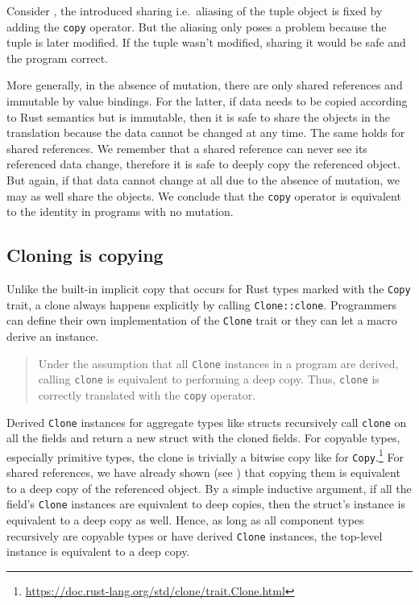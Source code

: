 Consider , the introduced sharing
i.e.~aliasing of the tuple object is fixed by adding the
\passthrough{\lstinline!copy!} operator. But the aliasing only poses a
problem because the tuple is later modified. If the tuple wasn't
modified, sharing it would be safe and the program correct.

More generally, in the absence of mutation, there are only shared
references and immutable by value bindings. For the latter, if data
needs to be copied according to Rust semantics but is immutable, then it
is safe to share the objects in the translation because the data cannot
be changed at any time. The same holds for shared references. We
remember that a shared reference can never see its referenced data
change, therefore it is safe to deeply copy the referenced object. But
again, if that data cannot change at all due to the absence of mutation,
we may as well share the objects. We conclude that the
\passthrough{\lstinline!copy!} operator is equivalent to the identity in
programs with no mutation.

\subsection{Cloning is copying}
\label{sec:clone-is-copy}

Unlike the built-in implicit copy that occurs for Rust types marked with
the \passthrough{\lstinline!Copy!} trait, a clone always happens
explicitly by calling \passthrough{\lstinline!Clone::clone!}.
Programmers can define their own implementation of the
\passthrough{\lstinline!Clone!} trait or they can let a macro derive an
instance.

\begin{quote}
Under the assumption that all \passthrough{\lstinline!Clone!} instances
in a program are derived, calling \passthrough{\lstinline!clone!} is
equivalent to performing a deep copy. Thus,
\passthrough{\lstinline!clone!} is correctly translated with the
\passthrough{\lstinline!copy!} operator.
\end{quote}

Derived \passthrough{\lstinline!Clone!} instances for aggregate types like
structs recursively call \passthrough{\lstinline!clone!} on all the fields and
return a new struct with the cloned fields. For copyable types, especially
primitive types, the clone is trivially a bitwise copy like for
\lstinline!Copy!.\footnote{\url{https://doc.rust-lang.org/std/clone/trait.Clone.html}}
For shared references, we have already shown (see
) that copying them is equivalent to a deep
copy of the referenced object. By a simple inductive argument, if all the
field's \passthrough{\lstinline!Clone!} instances are equivalent to deep copies,
then the struct's instance is equivalent to a deep copy as well. Hence, as long
as all component types recursively are copyable types or have derived
\passthrough{\lstinline!Clone!} instances, the top-level instance is equivalent
to a deep copy.


